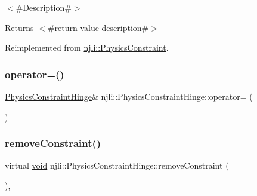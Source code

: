 $<$\#\+Description\#$>$

\begin{DoxyReturn}{Returns}
$<$\#return value description\#$>$ 
\end{DoxyReturn}


Reimplemented from \mbox{\hyperlink{classnjli_1_1_physics_constraint_a4cb967ebae1b139bc7511bc9fcc074c5}{njli\+::\+Physics\+Constraint}}.

\mbox{\label{classnjli_1_1_physics_constraint_hinge_af2dbf3661171c4725e57626d7ad7944b}} 
\subsubsection{\texorpdfstring{operator=()}{operator=()}}
{\footnotesize\ttfamily \mbox{\hyperlink{classnjli_1_1_physics_constraint_hinge}{Physics\+Constraint\+Hinge}}\& njli\+::\+Physics\+Constraint\+Hinge\+::operator= (\begin{DoxyParamCaption}\item[{const \mbox{\hyperlink{classnjli_1_1_physics_constraint_hinge}{Physics\+Constraint\+Hinge}} \&}]{ }\end{DoxyParamCaption})\hspace{0.3cm}{\ttfamily [protected]}}

\mbox{\label{classnjli_1_1_physics_constraint_hinge_aad341621e3585f5f8c3c2b4d369be7e2}} 
\subsubsection{\texorpdfstring{remove\+Constraint()}{removeConstraint()}}
{\footnotesize\ttfamily virtual \mbox{\hyperlink{_thread_8h_af1e856da2e658414cb2456cb6f7ebc66}{void}} njli\+::\+Physics\+Constraint\+Hinge\+::remove\+Constraint (\begin{DoxyParamCaption}{ }\end{DoxyParamCaption})\hspace{0.3cm}{\ttfamily [protected]}, {\ttfamily [virtual]}}



